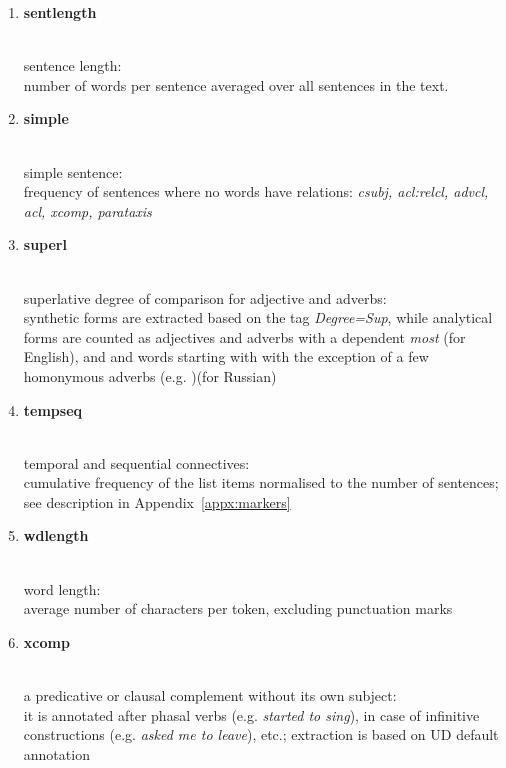 \begin{enumerate}
	\item \hypertarget{ft:sentlength}{\textbf{sentlength}} \\
		sentence length: \\
		number of words per sentence averaged over all sentences in the text.
	
	\item \hypertarget{ft:simple}{\textbf{simple}} \\
		simple sentence: \\
		frequency of sentences where no words have relations: \textit{csubj, acl:relcl, advcl, acl, xcomp, parataxis}
	
	\item \hypertarget{ft:superl}{\textbf{superl}} \\
		superlative degree of comparison for adjective and adverbs: \\
		synthetic forms are extracted based on the tag \textit{Degree=Sup}, while analytical forms are counted as adjectives and adverbs with a dependent \textit{most} (for English), and  and words starting with  with the exception of a few homonymous adverbs (e.g. )(for Russian)
	
	\item \hypertarget{ft:tempseq}{\textbf{tempseq}} \\
		temporal and sequential connectives: \\ 
		cumulative frequency of the list items normalised to the number of sentences; see description in Appendix~\ref{appx:markers}
	
	\item \hypertarget{ft:wdlength}{\textbf{wdlength}} \\
		word length: \\
		average number of characters per token, excluding punctuation marks
	
	\item \hypertarget{ft:xcomp}{\textbf{xcomp}} \\
		a predicative or clausal complement without its own subject: \\
		it is annotated after phasal verbs (e.g. \textit{started to sing}), in case of infinitive constructions (e.g. \textit{asked me to leave}), etc.; extraction is based on UD default annotation
	 
\end{enumerate}

